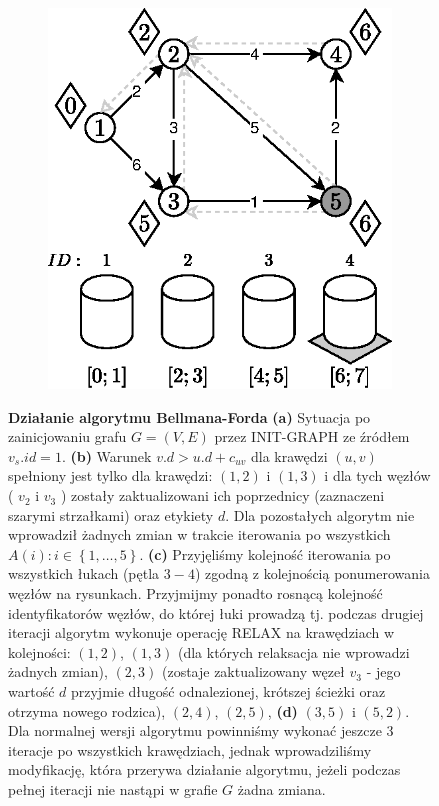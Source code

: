 \begin{figure}[!htbp]
\begin{subfigure}[b]{0.33\textwidth}
		\caption{}
	\end{subfigure}
	\begin{subfigure}[b]{0.33\textwidth}
		\includegraphics[width=\textwidth]{Chapter_II/3/f.eps}
		\caption{}
	\end{subfigure}
	\caption{\textbf{Działanie algorytmu Bellmana-Forda} \textbf{(a)} Sytuacja po zainicjowaniu grafu $G = \left( V, E \right)$ przez \textsf{INIT-GRAPH} ze źródłem $v_{s}.id = 1$. \textbf{(b)} Warunek $ v.d > u.d + c_{uv} $ dla krawędzi $ \left( u, v \right) $ spełniony jest tylko dla krawędzi: $ \left( 1, 2 \right) $ i $ \left( 1, 3 \right) $ i dla tych węzłów ( $v_{2}$ i $v_{3}$ ) zostały zaktualizowani ich poprzednicy (zaznaczeni szarymi strzałkami) oraz etykiety $d$. Dla pozostałych algorytm nie wprowadził żadnych zmian w trakcie iterowania po wszystkich $ A \left( i \right) : i \in \left\{ 1, \ldots, 5\right\}$. \textbf{(c)} Przyjęliśmy kolejność iterowania po wszystkich łukach (pętla $3-4$) zgodną z kolejnością ponumerowania węzłów na rysunkach. Przyjmijmy ponadto rosnącą kolejność identyfikatorów węzłów, do której łuki prowadzą tj. podczas drugiej iteracji algorytm wykonuje operację \textsf{RELAX} na krawędziach w kolejności: $ \left( 1, 2 \right) $, $ \left( 1, 3 \right) $ (dla których relaksacja nie wprowadzi żadnych zmian), $ \left( 2, 3 \right) $ (zostaje zaktualizowany węzeł $v_{3}$ - jego wartość $d$ przyjmie długość odnalezionej, krótszej ścieżki oraz otrzyma nowego rodzica), $ \left( 2, 4 \right) $, $ \left( 2, 5 \right) $, \textbf{(d)} $ \left( 3, 5 \right) $ i $ \left( 5, 2 \right) $. Dla normalnej wersji algorytmu powinniśmy wykonać jeszcze 3 iteracje po wszystkich krawędziach, jednak wprowadziliśmy modyfikację, która przerywa działanie algorytmu, jeżeli podczas pełnej iteracji nie nastąpi w grafie $G$ żadna zmiana.} \label{fig:exampleBellmanFord}
\end{figure}

